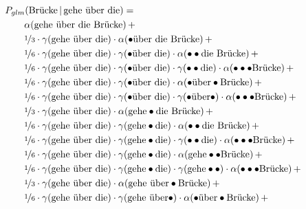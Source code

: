 \documentclass[11pt,a4paper]{article}
\newcommand\givenbase[1][]{\,#1\lvert\,}
\let\given\givenbase
\newcommand{\probSymbol}[1][]{P_{#1}}
\newcommand{\prob}[2][]{\probSymbol[#1](#2)}
\newcommand{\probCond}[3][]{\prob[#1]{#2 \given #3}}
\begin{document}
\begin{equation}
  \begin{split}
    &\hspace{-2em}\probCond[glm]{\text{Br\"ucke}}{\text{gehe \"uber die}} = \\
    &\alpha(\text{gehe \"uber die Br\"ucke}) \, + \\
    &\nicefrac{1}{3} \cdot \gamma(\text{gehe \"uber die}) \cdot \alpha(\bullet\text{\"uber die Br\"ucke}) \, + \\
    &\nicefrac{1}{6} \cdot \gamma(\text{gehe \"uber die}) \cdot \gamma(\bullet\text{\"uber die}) \cdot \alpha(\bullet\bullet\text{die Br\"ucke}) \, + \\
    &\nicefrac{1}{6} \cdot \gamma(\text{gehe \"uber die}) \cdot \gamma(\bullet\text{\"uber die}) \cdot \gamma(\bullet\bullet\text{die}) \cdot \alpha(\bullet\bullet\bullet\text{Br\"ucke}) \, + \\
    &\nicefrac{1}{6} \cdot \gamma(\text{gehe \"uber die}) \cdot \gamma(\bullet\text{\"uber die}) \cdot \alpha(\bullet\text{\"uber}\bullet\text{Br\"ucke}) \, + \\
    &\nicefrac{1}{6} \cdot \gamma(\text{gehe \"uber die}) \cdot \gamma(\bullet\text{\"uber die}) \cdot \gamma(\bullet\text{\"uber}\bullet) \cdot \alpha(\bullet\bullet\bullet\text{Br\"ucke}) \, + \\
    &\nicefrac{1}{3} \cdot \gamma(\text{gehe \"uber die}) \cdot \alpha(\text{gehe}\bullet\text{die Br\"ucke}) \, + \\
    &\nicefrac{1}{6} \cdot \gamma(\text{gehe \"uber die}) \cdot \gamma(\text{gehe}\bullet\text{die}) \cdot \alpha(\bullet\bullet\text{die Br\"ucke}) \, + \\
    &\nicefrac{1}{6} \cdot \gamma(\text{gehe \"uber die}) \cdot \gamma(\text{gehe}\bullet\text{die}) \cdot \gamma(\bullet\bullet\text{die}) \cdot \alpha(\bullet\bullet\bullet\text{Br\"ucke}) \, + \\
    &\nicefrac{1}{6} \cdot \gamma(\text{gehe \"uber die}) \cdot \gamma(\text{gehe}\bullet\text{die}) \cdot \alpha(\text{gehe}\bullet\bullet\text{Br\"ucke}) \, + \\
    &\nicefrac{1}{6} \cdot \gamma(\text{gehe \"uber die}) \cdot \gamma(\text{gehe}\bullet\text{die}) \cdot \gamma(\text{gehe}\bullet\bullet) \cdot \alpha(\bullet\bullet\bullet\text{Br\"ucke}) \, + \\
    &\nicefrac{1}{3} \cdot \gamma(\text{gehe \"uber die}) \cdot \alpha(\text{gehe \"uber}\bullet\text{Br\"ucke}) \, + \\
    &\nicefrac{1}{6} \cdot \gamma(\text{gehe \"uber die}) \cdot \gamma(\text{gehe \"uber}\bullet) \cdot \alpha(\bullet\text{\"uber}\bullet\text{Br\"ucke}) \, + \\

\end{split}
\end{equation}
\end{document}
